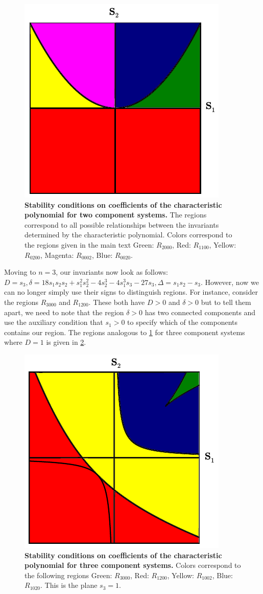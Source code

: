\documentclass{amsart}
\theoremstyle{definition}
\theoremstyle{remark}
\numberwithin{equation}{section}
\begin{document}
\begin{figure}[!ht]
\centering
\noindent\includegraphics[width=0.5\columnwidth]{fig/region2x2.pdf}
\caption{{\bf Stability conditions on coefficients of the characteristic polynomial for two component systems.} The regions correspond to all possible relationships between the invariants determined by the characteristic polynomial. Colors correspond to the regions given in the main text Green: $R_{2000}$, Red: $R_{1100}$, Yellow: $R_{0200}$, Magenta: $R_{0002}$, Blue: $R_{0020}$.}
\label{fig:region2x2}
\end{figure}

Moving to $n=3$, our invariants now look as follows: $D = s_3, \delta
= 18 s_1 s_2 s_2 + s_1^2 s_2^2 - 4 s_2^3 - 4 s_1^3 s_3 - 27 s_3,
\Delta = s_1 s_2 - s_3$.  However, now we can no longer simply use their
signs to distinguish regions.  For instance, consider the regions
$R_{3000}$ and $R_{1200}$.  These both have $D > 0$ and $\delta > 0$
but to tell them apart, we need to note that the region $\delta > 0$
has two connected components and use the auxiliary condition that $s_1 > 0$ to
specify which of the components contains our region. The regions analogous to \ref{fig:region2x2} for three component systems where $D=1$ is given in \ref{fig:region3x3}.

\begin{figure}[!ht]
\centering
\noindent\includegraphics[width=0.5\columnwidth]{fig/region3x3.pdf}
\caption{{\bf Stability conditions on coefficients of the characteristic polynomial for three component systems.} Colors correspond to the following regions Green: $R_{3000}$, Red: $R_{1200}$, Yellow: $R_{1002}$, Blue: $R_{1020}$. This is the plane $s_3=1$.}
\label{fig:region3x3}
\end{figure}
\end{document}
